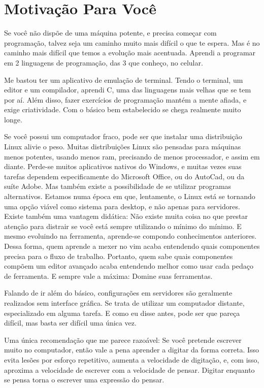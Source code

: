 \section{Motivação Para Você}
Se você não dispõe de uma máquina potente, e precisa começar com programação, talvez seja um caminho muito mais difícil o que te espera.
Mas é no caminho mais difícil que temos a evolução mais acentuada.
Aprendi a programar em 2 linguagens de programação, das 3 que conheço, no celular.

Me bastou ter um aplicativo de emulação de terminal.
Tendo o terminal, um editor e um compilador, aprendi C, uma das linguagens mais velhas que se tem por aí.
Além disso, fazer exercícios de programação mantém a mente afiada, e exige criatividade.
Com o básico bem estabelecido se chega realmente muito longe.


Se você possui um computador fraco, pode ser que instalar uma distribuição Linux alivie o peso.
Muitas distribuições Linux são pensadas para máquinas menos potentes, usando menos ram, precisando de menos processador, e assim em diante.
Perde-se muitos aplicativos nativos do Windows, e muitas vezes suas tarefas dependem especificamente do Microsoft Office, ou do AutoCad, ou da suíte Adobe.
Mas também existe a possibilidade de se utilizar programas alternativos.
Estamos numa época em que, lentamente, o Linux está se tornando uma opção viável como sistema para desktop, e não apenas para servidores.
Existe também uma vantagem didática:
Não existe muita coisa no que prestar atenção para distrair se você está sempre utilizando o mínimo do mínimo.
E mesmo evoluindo na ferramenta, aprende-se compondo conhecimentos anteriores.
Dessa forma, quem aprende a mexer no vim acaba entendendo quais componentes precisa para o fluxo de trabalho.
Portanto, quem sabe quais componentes compõem um editor avançado acaba entendendo melhor como usar cada pedaço de ferramenta.
E sempre vale a máxima: Domine suas ferramentas.

Falando de ir além do básico, configurações em servidores são geralmente realizados sem interface gráfica.
Se trata de utilizar um computador distante, especializado em alguma tarefa.
E como eu disse antes, pode ser que pareça difícil, mas basta ser difícil uma única vez.

Uma única recomendação que me parece razoável: Se você pretende escrever muito no computador, então vale a pena
aprender a digitar da forma correta.
Isso evita lesões por esforço repetitivo, aumenta a velocidade de digitação,
e, com isso, aproxima a velocidade de escrever com a velocidade de pensar.
Digitar enquanto se pensa torna o escrever uma expressão do pensar.

